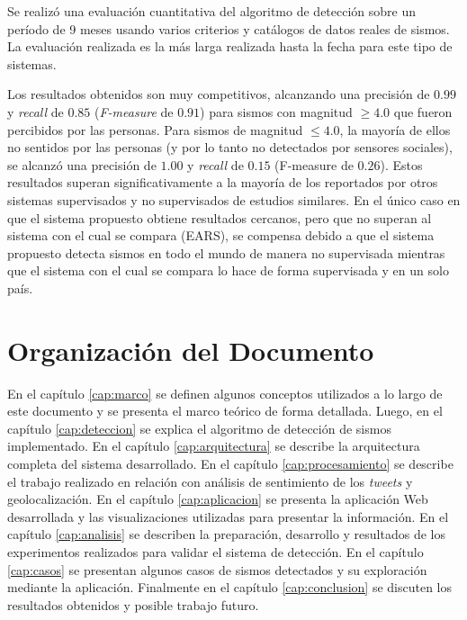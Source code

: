 Se realizó una evaluación cuantitativa del algoritmo de detección sobre un período de 9 meses usando varios criterios y catálogos de datos reales de sismos. 
%
La evaluación realizada es la más larga realizada hasta la fecha para este tipo de sistemas.


Los resultados obtenidos son muy competitivos, alcanzando una precisión de $0.99$ y \textit{recall} de $0.85$ (\textit{F-measure} de $0.91$) para sismos con magnitud $\geq 4.0$ que fueron percibidos por las personas. 
%
Para sismos de magnitud $\leq 4.0$, la mayoría de ellos no sentidos por las personas (y por lo tanto no detectados por sensores sociales), se alcanzó una precisión de $1.00$ y \textit{recall} de $0.15$ (F-measure de $0.26$).
%
Estos resultados superan significativamente a la mayoría de los reportados por otros sistemas supervisados y no supervisados de estudios similares.
%
En el único caso en que el sistema propuesto obtiene resultados cercanos, pero que no superan al sistema con el cual se compara (EARS\cite{avvenuti2014ears}), se compensa debido a que el sistema propuesto detecta sismos en todo el mundo de manera no supervisada mientras que el sistema con el cual se compara lo hace de forma supervisada y en un solo país.


\section{Organización del Documento}

En el capítulo \ref{cap:marco} se definen algunos conceptos utilizados a lo largo de este documento y se presenta el marco teórico de forma detallada. 
%
Luego, en el capítulo \ref{cap:deteccion} se explica el algoritmo de detección de sismos implementado. 
%
En el capítulo \ref{cap:arquitectura} se describe la arquitectura completa del sistema desarrollado. 
%
En el capítulo \ref{cap:procesamiento} se describe el trabajo realizado en relación con análisis de sentimiento de los \textit{tweets} y geolocalización. 
% 
En el capítulo \ref{cap:aplicacion} se presenta la aplicación Web desarrollada y las visualizaciones utilizadas para presentar la información. 
%
En el capítulo \ref{cap:analisis} se describen la preparación, desarrollo y resultados de los experimentos realizados para validar el sistema de detección. 
%
En el capítulo \ref{cap:casos} se presentan algunos casos de sismos detectados y su exploración mediante la aplicación.
%
Finalmente en el capítulo \ref{cap:conclusion} se discuten los resultados obtenidos y posible trabajo futuro.  